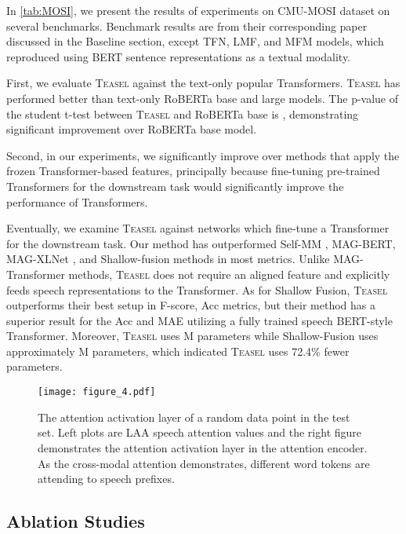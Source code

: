 \documentclass[letterpaper]{article} \usepackage{spconf,amsmath,graphicx}
\newcommand{\teasel}{\textsc{Teasel }}
\begin{document}
In \autoref{tab:MOSI}, we present the results of experiments on CMU-MOSI dataset on several benchmarks. Benchmark results are from their corresponding paper discussed in the Baseline section, except TFN, LMF, and MFM models, which \cite{hazarika2020misa} reproduced using BERT sentence representations as a textual modality.

First, we evaluate \teasel against the text-only popular Transformers. \teasel has performed better than text-only RoBERTa base and large models. The p-value of the student t-test between \teasel and RoBERTa base is , demonstrating significant improvement over RoBERTa base model.
    
Second, in our experiments, we significantly improve over methods that apply the frozen Transformer-based features, principally because fine-tuning pre-trained Transformers for the downstream task would significantly improve the performance of Transformers. 
    
Eventually, we examine \teasel against networks which fine-tune a Transformer for the downstream task. Our method has outperformed Self-MM \cite{yu2021le}, MAG-BERT, MAG-XLNet \cite{rahman2020integrating}, and Shallow-fusion \cite{siriwardhana2020jointly} methods in most metrics. Unlike MAG-Transformer methods, \teasel does not require an aligned feature and explicitly feeds speech representations to the Transformer. As for Shallow Fusion, \teasel outperforms their best setup in F-score, Acc metrics, but their method has a superior result for the Acc and MAE utilizing a fully trained speech BERT-style Transformer. Moreover, \teasel uses M parameters while Shallow-Fusion uses approximately M parameters, which indicated \teasel uses 72.4\% fewer parameters.







\begin{figure*}[ht]
\centering
\texttt{[image: figure\_4.pdf]}
\caption{The attention activation layer of a random data point in the test set. Left plots are LAA  speech attention values and the right figure demonstrates the attention activation layer in the attention encoder. As the cross-modal attention demonstrates, different word tokens are attending to speech prefixes.}
\label{fig:visualization}
\end{figure*}

\subsection{Ablation Studies}
\label{ssec:ablation studies}
\end{document}
